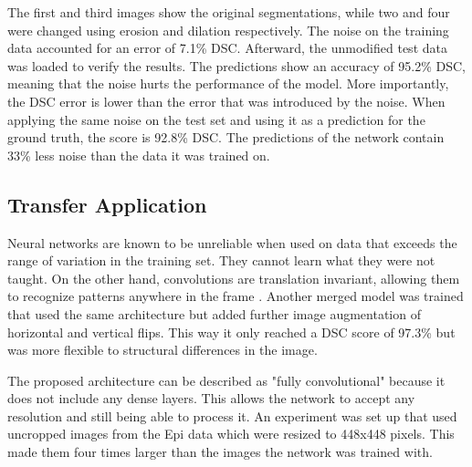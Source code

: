 The first and third images show the original segmentations, while two and four were changed using erosion and dilation respectively. The noise on the training data accounted for an error of 7.1\% DSC. Afterward, the unmodified test data was loaded to verify the results. The predictions show an accuracy of 95.2\% DSC, meaning that the noise hurts the performance of the model. More importantly, the DSC error is lower than the error that was introduced by the noise. When applying the same noise on the test set and using it as a prediction for the ground truth, the score is 92.8\% DSC. The predictions of the network contain 33\% less noise than the data it was trained on.

\subsection{Transfer Application}

Neural networks are known to be unreliable when used on data that exceeds the range of variation in the training set. They cannot learn what they were not taught. On the other hand, convolutions are translation invariant, allowing them to recognize patterns anywhere in the frame \cite{Chollet2017}. Another merged model was trained that used the same architecture but added further image augmentation of horizontal and vertical flips. This way it only reached a DSC score of 97.3\% but was more flexible to structural differences in the image.

The proposed architecture can be described as "fully convolutional" because it does not include any dense layers. This allows the network to accept any resolution and still being able to process it. An experiment was set up that used uncropped images from the Epi data which were resized to 448x448 pixels. This made them four times larger than the images the network was trained with.

